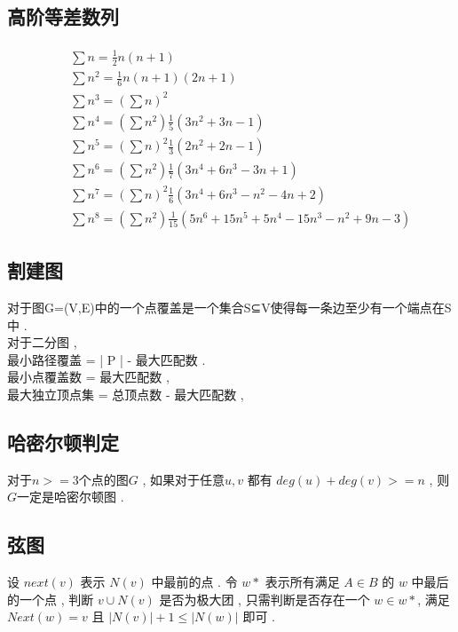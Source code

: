 \subsection{高阶等差数列}
    \paragraph{}
    \begin{eqnarray}
        && \sum n = \frac{1}{2}n(n+1)\\
        && \sum n^2 = \frac{1}{6}n(n+1)(2n+1) \\
        && \sum n^3 = \left(\sum n\right)^2 \\
        && \sum n^4 = \left(\sum n^2\right)\frac{1}{5}(3n^2+3n-1)\\
        && \sum n^5 = \left(\sum n\right)^2\frac{1}{3}(2n^2+2n-1)\\
        && \sum n^6 = \left(\sum n^2\right)\frac{1}{7}(3n^4+6n^3-3n+1)\\
        && \sum n^7 = \left(\sum n\right)^2\frac{1}{6}(3n^4+6n^3-n^2-4n+2)\\
        && \sum n^8 = \left(\sum n^2\right)\frac{1}{15}(5n^6+15n^5+5n^4-15n^3-n^2+9n-3)
    \end{eqnarray}

\subsection{割建图}
对于图G=(V,E)中的一个点覆盖是一个集合S⊆V使得每一条边至少有一个端点在S中 . \\
        对于二分图 , \\
        最小路径覆盖 = | P | - 最大匹配数 . \\
        最小点覆盖数 = 最大匹配数 , \\
        最大独立顶点集 = 总顶点数 - 最大匹配数 , \\
\subsection{哈密尔顿判定}
对于$ n >= 3 $个点的图$ G $ , 如果对于任意$ u, v $ 都有  $ deg(u) + deg(v) >= n $ , 则$ G $一定是哈密尔顿图 .
\subsection{弦图}
设 $next(v)$ 表示 $N(v)$ 中最前的点 . 
令 $w*$ 表示所有满足 $A \in B$ 的 $w$ 中最后的一个点 , 
判断 $v \cup N(v)$ 是否为极大团 , 
只需判断是否存在一个 $w \in w*$, 
满足 $Next(w)=v$ 且 $|N(v)| + 1 \leq |N(w)|$ 即可 . 
